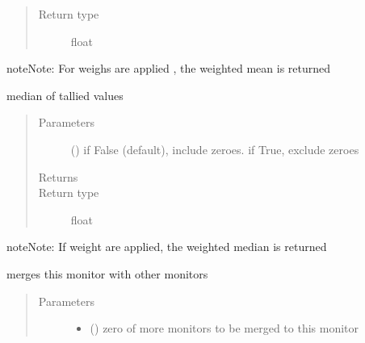 \documentclass[letterpaper,10pt,english]{sphinxmanual}
\begin{document}
\begin{fulllineitems}
\begin{fulllineitems}
\begin{quote}
\begin{description}
\item[{Return type}] \leavevmode
float

\end{description}\end{quote}

\begin{sphinxadmonition}{note}{Note:}
For weighs are applied , the weighted mean is returned
\end{sphinxadmonition}

\end{fulllineitems}


\begin{fulllineitems}
\label{\detokenize{Reference:salabim.Monitor.median}}
median of tallied values
\begin{quote}\begin{description}
\item[{Parameters}] \leavevmode
{} () \textendash{} if False (default), include zeroes. if True, exclude zeroes

\item[{Returns}] \leavevmode
{}

\item[{Return type}] \leavevmode
float

\end{description}\end{quote}

\begin{sphinxadmonition}{note}{Note:}
If weight are applied, the weighted median is returned
\end{sphinxadmonition}

\end{fulllineitems}


\begin{fulllineitems}
\label{\detokenize{Reference:salabim.Monitor.merge}}
merges this monitor with other monitors
\begin{quote}\begin{description}
\item[{Parameters}] \leavevmode\begin{itemize}
\item {} 
 () \textendash{} zero of more monitors to be merged to this monitor


\end{itemize}
\end{description}
\end{quote}
\end{fulllineitems}
\end{fulllineitems}
\end{document}

